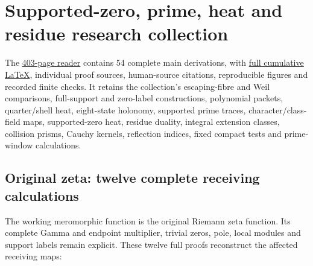 \documentclass[
]{article}
\author{}
\date{}
\begin{document}
\section{Supported-zero, prime, heat and residue research
collection}\label{supported-zero-prime-heat-and-residue-research-collection}

The \href{TAU_ZERO_PRIME_POSITIVITY.pdf}{403-page reader} contains 54
complete main derivations, with
\href{TAU_ZERO_PRIME_POSITIVITY.tex}{full cumulative LaTeX}, individual
proof sources, human-source citations, reproducible figures and recorded
finite checks. It retains the collection's escaping-fibre and Weil
comparisons, full-support and zero-label constructions, polynomial
packets, quarter/shell heat, eight-state holonomy, supported prime
traces, character/class-field maps, supported-zero heat, residue
duality, integral extension classes, collision prisms, Cauchy kernels,
reflection indices, fixed compact tests and prime-window calculations.

\subsection{Original zeta: twelve complete receiving
calculations}\label{original-zeta-twelve-complete-receiving-calculations}

The working meromorphic function is the original Riemann zeta function.
Its complete Gamma and endpoint multiplier, trivial zeros, pole, local
modules and support labels remain explicit. These twelve full proofs
reconstruct the affected receiving maps:
\end{document}
